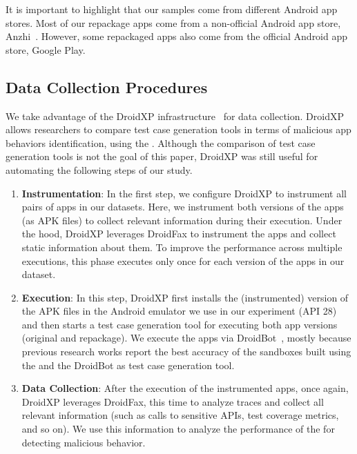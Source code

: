 It is important to highlight that our samples come from different Android app stores. Most of our repackage apps come from a non-official
Android app store, Anzhi~\cite{anzhi}. However, some repackaged apps also come from the official Android app store, Google Play.


\subsection{Data Collection Procedures} \label{sec:dataCollectionProc}

We take advantage of the DroidXP infrastructure~\cite{DBLP:conf/scam/CostaMCMVBC20}
for data collection. DroidXP allows researchers to compare 
test case generation tools in terms of malicious app behaviors identification, using the \mas. Although the comparison of test
case generation tools is not the goal of this paper, DroidXP
was still useful for automating the following steps of our study.


\begin{enumerate}[S1]
 \item \textbf{Instrumentation}: In the first step,
we configure DroidXP to instrument all pairs of apps in our datasets.
Here, we instrument both versions of the apps (as APK files) to collect relevant information during their execution. Under the hood, DroidXP leverages
DroidFax to instrument the apps and collect static
information about them. To improve the performance across multiple executions,
this phase executes only once for each version of the apps in our dataset.

\item \textbf{Execution}: In this step, DroidXP first installs the (instrumented) version of the APK files in the Android emulator we use in our experiment (API 28) and then starts a test case generation tool for executing both app versions (original and repackage). We execute the apps via DroidBot~\cite{DBLP:conf/icse/LiYGC17}, mostly because previous research works report the best accuracy of the sandboxes built using the \mas and the DroidBot as test case generation tool. 


\item \textbf{Data Collection}: After the execution of the instrumented apps, once again, DroidXP leverages DroidFax, this time to analyze traces and collect all relevant information (such as calls to sensitive APIs, test coverage metrics, and so on). We use this information to analyze the performance of the \mas for detecting malicious behavior.
\end{enumerate}


